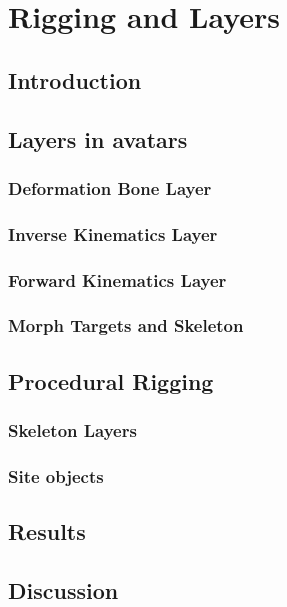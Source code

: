 \documentclass[../../main.tex]{subfiles}
\begin{document}
\chapter{Rigging and Layers}
\label{ch:rigging_layers}

\section{Introduction}

\section{Layers in avatars}

\subsection{Deformation Bone Layer}

\subsection{Inverse Kinematics Layer}

\subsection{Forward Kinematics Layer}

\subsection{Morph Targets and Skeleton}

\section{Procedural Rigging}

\subsection{Skeleton Layers}

\subsection{Site objects}

\section{Results}

\section{Discussion}
\end{document}
